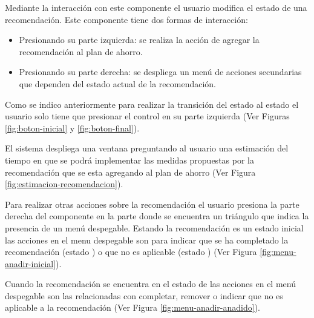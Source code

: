 Mediante la interacción con este componente el usuario modifica el estado
de una recomendación. Este componente tiene dos formas de interacción:
\begin{itemize}
\item Presionando su parte izquierda: se realiza la acción de agregar la
  recomendación al plan de ahorro.
\item Presionando su parte derecha: se despliega un menú de acciones
  secundarias que dependen del estado actual de la recomendación.
\end{itemize}

Como se indico anteriormente para realizar la transición del estado
 al estado  el usuario solo tiene
que presionar el control en su parte izquierda (Ver Figuras \ref{fig:boton-inicial}
y \ref{fig:boton-final}).

El sistema despliega una ventana preguntando al usuario una estimación
del tiempo en que se podrá implementar las medidas propuestas por la
recomendación que se esta agregando al plan de ahorro (Ver Figura \ref{fig:estimacion-recomendacion}).

Para realizar otras acciones sobre la recomendación el usuario presiona la parte
derecha del componente en la parte donde se encuentra un triángulo que indica la
presencia de un menú despegable.
Estando la recomendación es un estado inicial  las
acciones en el menu despegable son para indicar que se ha completado la recomendación
(estado ) o que no es aplicable
(estado ) (Ver Figura \ref{fig:menu-anadir-inicial}).


Cuando la recomendación se encuentra en el estado de  las
acciones en el menú despegable son las relacionadas con completar, remover o indicar
que no es aplicable a la recomendación (Ver Figura \ref{fig:menu-anadir-anadido}).

